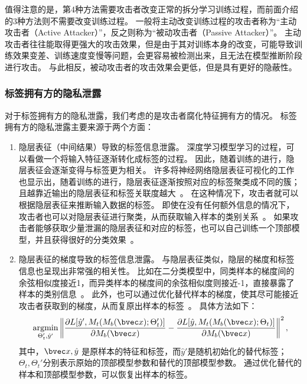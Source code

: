 值得注意的是，第4种方法需要攻击者改变正常的拆分学习训练过程，而前面介绍的3种方法则不需要改变训练过程。
%
一般将主动改变训练过程的攻击者称为“主动攻击者（Active Attacker）”，反之则称为“被动攻击者（Passive Attacker）”。
%
主动攻击者往往能取得更强大的攻击效果，但是由于其对训练本身的改变，可能导致训练效果变差、训练速度变慢等问题，会更容易被检测出来，且无法在模型推断阶段进行攻击。
与此相反，被动攻击者的攻击效果会更低，但是具有更好的隐蔽性。

\subsubsection{标签拥有方的隐私泄露}
对于标签拥有方的隐私泄露，我们考虑的是攻击者腐化特征拥有方的情况。
%
标签拥有方的隐私泄露主要来源于两个方面：
\begin{enumerate}
    \item 隐层表征（中间结果）导致的标签信息泄露。
    深度学习模型学习的过程，可以看做一个将输入特征逐渐转化成标签的过程。
    因此，随着训练的进行，隐层表征会逐渐变得与标签更为相关。
    许多将神经网络隐层表征可视化的工作也显示出，随着训练的进行，隐层表征逐渐按照对应的标签聚类成不同的簇；且越靠近输出的隐层表征和标签关联度越大~\cite{paulo2017visualize_hidden,pezzotti2017deepeyes,cantareira2020hidden_vector_fields}。
    在这种情况下，攻击者就可以根据隐层表征来推断输入数据的标签。
    即使在没有任何额外信息的情况下，攻击者也可以对隐层表征进行聚类，从而获取输入样本的类别关系~\cite{liujunlin2022clustering_attack,liujunlin2023distance_attack}。
    如果攻击者能够获取少量泄漏的隐层表征和对应的标签，也可以自己训练一个顶部模型，并且获得很好的分类效果~\cite{fucong2022label_infer_attack}。
    \item 隐层表征的梯度导致的标签信息泄露。
    与隐层表征类似，隐层的梯度和标签信息也呈现出非常强的相关性。
    比如在二分类模型中，同类样本的梯度间的余弦相似度接近1，而异类样本的梯度间的余弦相似度则接近-1，直接暴露了样本的类别信息~\cite{oscarli2022label_defense_marvell}。
    此外，也可以通过优化替代样本的梯度，使其尽可能接近攻击者获取到的梯度，从而复原出样本的标签~\cite{erdogan2022unsplit}。
    具体方法如下：
    \begin{equation}
        \mathop{\text{argmin}}_{\Theta_t', \hat y'} \left\Vert \dfrac{\partial L[\hat y', M_t(M_b(\bvec x);\Theta_t')]}{\partial M_b(\bvec x)} - \dfrac{\partial L[\hat y, M_t(M_b(\bvec x);\Theta_t)]}{\partial M_b(\bvec x)} \right\Vert^2,
    \end{equation}
    其中，$\bvec x, \hat y$ 是原样本的特征和标签，而$\hat y'$是随机初始化的替代标签；$\Theta_t, \Theta_t'$分别表示原始的顶部模型参数和替代的顶部模型参数。
    通过优化替代的样本和顶部模型参数，可以恢复出样本的标签。
\end{enumerate}

